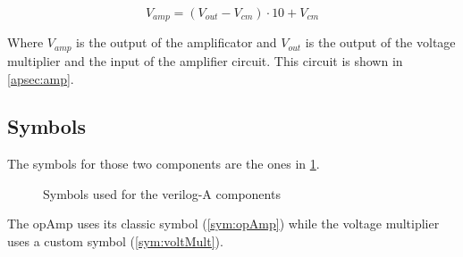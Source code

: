 \begin{equation}
  V_{amp}=(V_{out}-V_{cm})\cdot10+V_{cm}
\end{equation}

Where $V_{amp}$ is the output of the amplificator and $V_{out}$ is the output of the voltage multiplier and the input of the amplifier circuit.
This circuit is shown in \cref{apsec:amp}.

\subsection{Symbols}

The symbols for those two components are the ones in \cref{sym:models}.

\begin{figure}[H]
  \centering
  \hspace*{2cm}
  \hfill
  \hspace*{2cm}
  \caption{Symbols used for the verilog-A components}
  \label{sym:models}
\end{figure}

The \ac{opAmp} uses its classic symbol (\cref{sym:opAmp}) while the voltage multiplier uses a custom symbol (\cref{sym:voltMult}).
